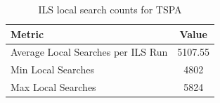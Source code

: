 \begin{table}[h!]
\centering
\begin{tabular}{lc}
\hline
Metric & Value \\
\hline
Average Local Searches per ILS Run & 5107.55 \\
Min Local Searches & 4802 \\
Max Local Searches & 5824 \\
\hline
\end{tabular}
\caption{ILS local search counts for TSPA}
\label{tab:TSPA_ils_counts}
\end{table}
